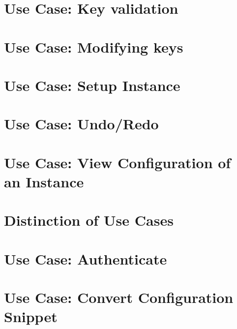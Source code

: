 \let\mypdfximage\pdfximage\def\pdfximage{\immediate\mypdfximage}\documentclass[twoside]{book}
\newcommand{\+}{\discretionary{\mbox{\scriptsize$\hookleftarrow$}}{}{}}
\begin{document}
\chapter{Use Case\+: Key validation}
\label{doc_usecases_elektra_web_UC_key_validation_md}

\chapter{Use Case\+: Modifying keys}
\label{doc_usecases_elektra_web_UC_modifying_keys_md}

\chapter{Use Case\+: Setup Instance}
\label{doc_usecases_elektra_web_UC_setup_instance_md}

\chapter{Use Case\+: Undo/\+Redo}
\label{doc_usecases_elektra_web_UC_undo_redo_md}

\chapter{Use Case\+: View Configuration of an Instance}
\label{doc_usecases_elektra_web_UC_view_config_md}

\chapter{Distinction of Use Cases}
\label{doc_usecases_snippet_sharing_distinction_use_cases_md}

\chapter{Use Case\+: Authenticate}
\label{doc_usecases_snippet_sharing_UC_authenticate_md}

\chapter{Use Case\+: Convert Configuration Snippet}
\label{doc_usecases_snippet_sharing_UC_convert_snippet_md}

\end{document}
